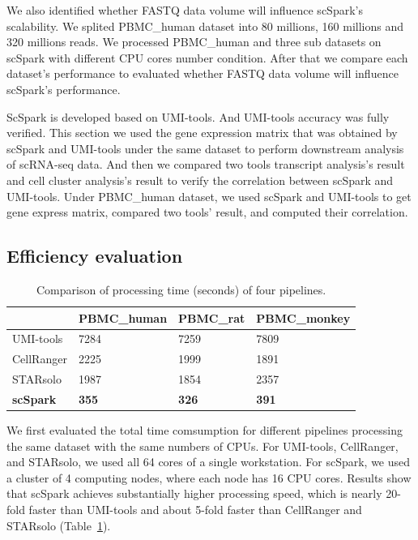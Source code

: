 \documentclass[conference]{IEEEtran}
\begin{document}
We also identified whether FASTQ data volume will influence scSpark's scalability.
We splited PBMC\_human dataset into 80 millions, 160 millions and 320 millions reads.
We processed PBMC\_human and three sub datasets on scSpark with different CPU cores number condition.
After that we compare each dataset's performance to evaluated whether FASTQ data volume will influence scSpark's performance.

ScSpark is developed based on UMI-tools. 
And UMI-tools accuracy was fully verified. 
This section we used the gene expression matrix that was obtained by scSpark and UMI-tools under the same dataset to perform downstream analysis of scRNA-seq data. 
And then we compared two tools transcript analysis's result and cell cluster analysis's result to verify the correlation between scSpark and UMI-tools. 
Under PBMC\_human dataset, we used scSpark and UMI-tools to get gene express matrix, compared two tools' result, and computed their correlation.

\subsection{Efficiency evaluation}

\begin{table}
	\centering
	\caption{Comparison of processing time (seconds) of four pipelines.}\label{tab1}
	\begin{tabular}{l | l | l | l }
		\hline
		 & PBMC\_human & PBMC\_rat & PBMC\_monkey \\ 
		\hline
		UMI-tools & 7284 & 7259 & 7809 \\
		CellRanger & 2225 & 1999 & 1891 \\
		STARsolo & 1987 & 1854 & 2357 \\
		\textbf{scSpark} & \textbf{355} & \textbf{326} & \textbf{391} \\
		\hline
	\end{tabular}
\end{table}

We first evaluated the total time comsumption for different pipelines processing the same dataset with the same numbers of CPUs. 
For UMI-tools, CellRanger, and STARsolo, we used all 64 cores of a single workstation. 
For scSpark, we used a cluster of 4 computing nodes, where each node has 16 CPU cores. 
Results show that scSpark achieves substantially higher processing speed, which is nearly 20-fold faster than UMI-tools and about 5-fold faster than CellRanger and STARsolo (Table~\ref{tab1}). 
\end{document}
